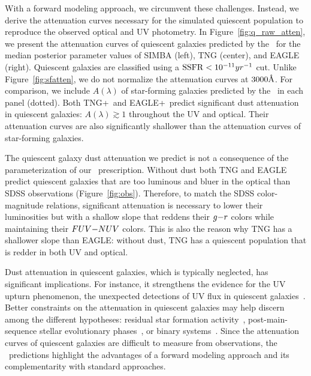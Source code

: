With a forward modeling approach, we circumvent these challenges. 
Instead, we derive the attenuation curves necessary for the simulated quiescent
population to reproduce the observed optical and UV photometry. 
In Figure~\ref{fig:q_raw_atten}, we present the attenuation curves of
quiescent galaxies predicted by the \eda~for the median posterior parameter
values of SIMBA (left), TNG (center), and EAGLE (right). 
Quiescent galaxies are classified using a ${\rm SSFR} < 10^{-11}{yr}^{-1}$ cut. 
Unlike Figure~\ref{fig:sfatten}, we do not normalize the attenuation curves at $3000\AA$. 
For comparison, we include $A(\lambda)$ of star-forming galaxies predicted
by the \eda~in each panel (dotted).
Both TNG+\eda~and EAGLE+\eda~predict significant dust attenuation in
quiescent galaxies: $A(\lambda) \gtrsim 1$ throughout the UV and optical. 
Their attenuation curves are also significantly shallower than the
attenuation curves of star-forming galaxies. 


The quiescent galaxy dust attenuation we predict is not a consequence of
the parameterization of our \eda~prescription. 
Without dust both TNG and EAGLE predict quiescent galaxies that are too
luminous and bluer in the optical than SDSS observations (Figure~\ref{fig:obs}). 
Therefore, to match the SDSS color-magnitude relations, significant
attenuation is necessary to lower their luminosities but with a shallow
slope that reddens their $g{-}r$ colors while maintaining their $FUV{-}NUV$ colors.
This is also the reason why TNG has a shallower slope than EAGLE: without
dust, TNG has a quiescent population that is redder in both UV and optical.   

Dust attenuation in quiescent galaxies, which is typically neglected, has
significant implications.  
For instance, it strengthens the evidence for the UV upturn phenomenon, the
unexpected detections of UV flux in quiescent galaxies~\citep[\eg][]{code1969,
oconnell1999, lecras2016, ali2018, dantas2021}. 
Better constraints on the attenuation in quiescent galaxies may help
discern among the different hypotheses: residual star formation activity~\citep[\eg~][]{kaviraj2007}, post-main-sequence stellar
evolutionary phases~\citep[\eg~][]{yi1997}, or binary systems~\citep[\eg~][]{han2007}.
Since the attenuation curves of quiescent galaxies are difficult to measure
from observations, the \eda~predictions highlight the advantages of a
forward modeling approach and its complementarity with standard approaches. 

